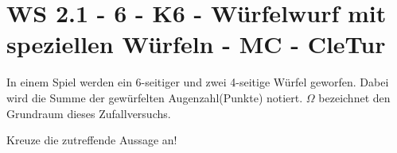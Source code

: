 \section{WS 2.1 - 6 - K6 - Würfelwurf mit speziellen Würfeln - MC - CleTur}

\begin{beispiel}[WS 2.1]{1} %
In einem Spiel werden ein 6-seitiger und zwei 4-seitige Würfel geworfen. Dabei wird die Summe der gewürfelten Augenzahl(Punkte) notiert. $\Omega $ bezeichnet den Grundraum dieses Zufallversuchs.

Kreuze die zutreffende Aussage an!

\end{beispiel}